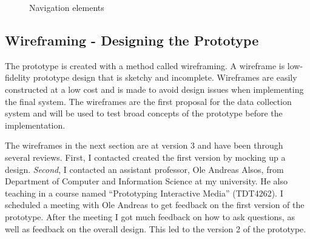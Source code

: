   \begin{figure}[H]
    \centering
    \caption{Navigation elements}
    \label{fig:navigation}
  \end{figure}

  \subsection{Wireframing - Designing the Prototype}

    The prototype is created with a method called wireframing. A wireframe is low-fidelity prototype design that is sketchy and incomplete. Wireframes are easily constructed at a low cost and is made to avoid design issues when implementing the final system. The wireframes are the first proposal for the data collection system and will be used to test broad concepts of the prototype before the implementation.

  The wireframes in the next section are at version 3 and have been through several reviews. First, I contacted created the first version by mocking up a design. {\it Second}, I contacted an assistant professor, Ole Andreas Alsos, from Department of Computer and Information Science at my university. He also teaching in a course named ``Prototyping Interactive Media'' (TDT4262). I scheduled a meeting with Ole Andreas to get feedback on the first version of the prototype. After the meeting I got much feedback on how to ask questions, as well as feedback on the overall design. This led to the version 2 of the prototype.

